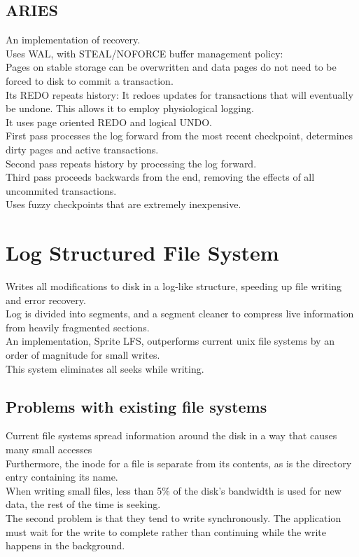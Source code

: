 \subsection{ARIES}
An implementation of recovery. \\
Uses WAL, with STEAL/NOFORCE buffer management policy:\\
Pages on stable storage can be overwritten and data pages do not need to be forced to disk to commit a transaction. \\
Its REDO repeats history: It redoes updates for transactions that will eventually be undone. This allows it to employ physiological logging.\\
It uses page oriented REDO and logical UNDO.\\
First pass processes the log forward from the most recent checkpoint, determines dirty pages and active transactions. \\
Second pass repeats history by processing the log forward.\\
Third pass proceeds backwards from the end, removing the effects of all uncommited transactions.\\
Uses fuzzy checkpoints that are extremely inexpensive.


\section{Log Structured File System}
Writes all modifications to disk in a log-like structure, speeding up file writing and error recovery.\\
Log is divided into segments, and a segment cleaner to compress live information from heavily fragmented sections.\\
An implementation, Sprite LFS, outperforms current unix file systems by an order of magnitude for small writes.\\
This system eliminates all seeks while writing.
\subsection{Problems with existing file systems}
Current file systems spread information around the disk in a way that causes many small accesses \\
Furthermore, the inode for a file is separate from its contents, as is the directory entry containing its name. \\
When writing small files, less than 5\% of the disk's bandwidth is used for new data, the rest of the time is seeking.\\
The second problem is that they tend to write synchronously. The application must wait for the write to complete rather than continuing while the write happens in the background.
\\
\\
